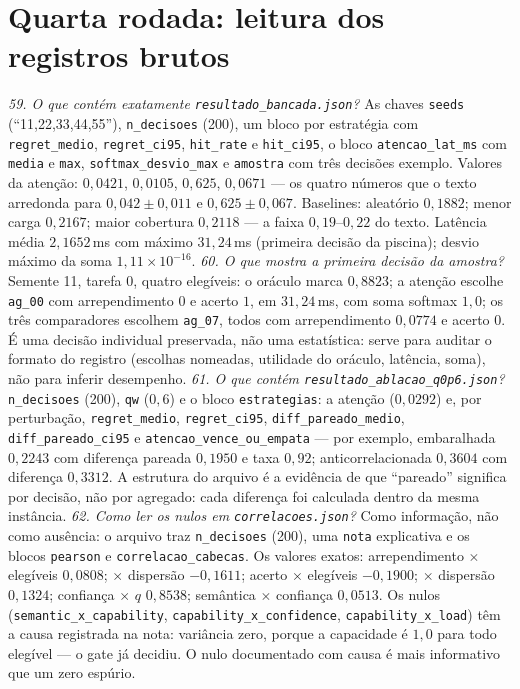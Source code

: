 \section{Quarta rodada: leitura dos registros brutos}
\textit{59. O que contém exatamente \nolinkurl{resultado_bancada.json}?} As chaves \texttt{seeds} (``11,22,33,44,55''), \texttt{n\_decisoes} (200), um bloco por estratégia com \texttt{regret\_medio}, \texttt{regret\_ci95}, \texttt{hit\_rate} e \texttt{hit\_ci95}, o bloco \texttt{atencao\_lat\_ms} com \texttt{media} e \texttt{max}, \texttt{softmax\_desvio\_max} e \texttt{amostra} com três decisões exemplo. Valores da atenção: $0{,}0421$, $0{,}0105$, $0{,}625$, $0{,}0671$ --- os quatro números que o texto arredonda para $0{,}042\pm0{,}011$ e $0{,}625\pm0{,}067$. Baselines: aleatório $0{,}1882$; menor carga $0{,}2167$; maior cobertura $0{,}2118$ --- a faixa $0{,}19$--$0{,}22$ do texto. Latência média $2{,}1652$\,ms com máximo $31{,}24$\,ms (primeira decisão da piscina); desvio máximo da soma $1{,}11\times10^{-16}$.
\textit{60. O que mostra a primeira decisão da amostra?} Semente 11, tarefa 0, quatro elegíveis: o oráculo marca $0{,}8823$; a atenção escolhe \texttt{ag\_00} com arrependimento $0$ e acerto $1$, em $31{,}24$\,ms, com soma softmax $1{,}0$; os três comparadores escolhem \texttt{ag\_07}, todos com arrependimento $0{,}0774$ e acerto $0$. É uma decisão individual preservada, não uma estatística: serve para auditar o formato do registro (escolhas nomeadas, utilidade do oráculo, latência, soma), não para inferir desempenho.
\textit{61. O que contém \nolinkurl{resultado_ablacao_q0p6.json}?} \texttt{n\_decisoes} (200), \texttt{qw} ($0{,}6$) e o bloco \texttt{estrategias}: a atenção ($0{,}0292$) e, por perturbação, \texttt{regret\_medio}, \texttt{regret\_ci95}, \texttt{diff\_pareado\_medio}, \texttt{diff\_pareado\_ci95} e \texttt{atencao\_vence\_ou\_empata} --- por exemplo, embaralhada $0{,}2243$ com diferença pareada $0{,}1950$ e taxa $0{,}92$; anticorrelacionada $0{,}3604$ com diferença $0{,}3312$. A estrutura do arquivo é a evidência de que ``pareado'' significa por decisão, não por agregado: cada diferença foi calculada dentro da mesma instância.
\textit{62. Como ler os nulos em \nolinkurl{correlacoes.json}?} Como informação, não como ausência: o arquivo traz \texttt{n\_decisoes} (200), uma \texttt{nota} explicativa e os blocos \texttt{pearson} e \texttt{correlacao\_cabecas}. Os valores exatos: arrependimento $\times$ elegíveis $0{,}0808$; $\times$ dispersão $-0{,}1611$; acerto $\times$ elegíveis $-0{,}1900$; $\times$ dispersão $0{,}1324$; confiança $\times$ $q$ $0{,}8538$; semântica $\times$ confiança $0{,}0513$. Os nulos (\texttt{semantic\_x\_capability}, \texttt{capability\_x\_confidence}, \texttt{capability\_x\_load}) têm a causa registrada na nota: variância zero, porque a capacidade é $1{,}0$ para todo elegível --- o gate já decidiu. O nulo documentado com causa é mais informativo que um zero espúrio.
